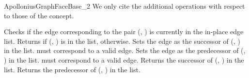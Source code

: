 \begin{ccRefConcept}{ApolloniusGraphFaceBase_2}
We only cite the additional operations with respect to those of the
 concept.

%
%
{Checks if the edge corresponding to the pair (, )
is currently in the in-place edge list. Returns  if
(, ) is in the list,  otherwise.}
\ccGlue
{}
{Sets the edge  as the successor of
(, ) in the list.
\ccPrecond {} must correspond to a valid edge.}
\ccGlue
{}
{Sets the edge  as the predecessor of
(, ) in the list.
\ccPrecond {} must correspond to a valid edge.}
\ccGlue
{}
{Returns the successor of (, ) in the list.}
\ccGlue
{}
{Returns the predecessor of (, ) in the list.}


\ccHasModels
{}


\ccSeeAlso
{}\\

\end{ccRefConcept}

